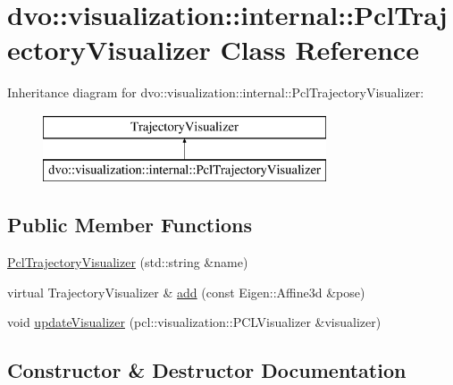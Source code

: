 \hypertarget{classdvo_1_1visualization_1_1internal_1_1_pcl_trajectory_visualizer}{}\section{dvo\+:\+:visualization\+:\+:internal\+:\+:Pcl\+Trajectory\+Visualizer Class Reference}
\label{classdvo_1_1visualization_1_1internal_1_1_pcl_trajectory_visualizer}
Inheritance diagram for dvo\+:\+:visualization\+:\+:internal\+:\+:Pcl\+Trajectory\+Visualizer\+:\begin{figure}[H]
\begin{center}
\leavevmode
\includegraphics[height=2.000000cm]{classdvo_1_1visualization_1_1internal_1_1_pcl_trajectory_visualizer}
\end{center}
\end{figure}
\subsection*{Public Member Functions}
\begin{DoxyCompactItemize}
\item 
\mbox{\hyperlink{classdvo_1_1visualization_1_1internal_1_1_pcl_trajectory_visualizer_a666f91d73d3a6ae83444bcca62e36bec}{Pcl\+Trajectory\+Visualizer}} (std\+::string \&name)
\item 
virtual Trajectory\+Visualizer \& \mbox{\hyperlink{classdvo_1_1visualization_1_1internal_1_1_pcl_trajectory_visualizer_aa174b5910657b2bfed45dfacd429a75a}{add}} (const Eigen\+::\+Affine3d \&pose)
\item 
void \mbox{\hyperlink{classdvo_1_1visualization_1_1internal_1_1_pcl_trajectory_visualizer_a16c8c79c3773408afba9ef57fcaea9e2}{update\+Visualizer}} (pcl\+::visualization\+::\+P\+C\+L\+Visualizer \&visualizer)
\end{DoxyCompactItemize}


\subsection{Constructor \& Destructor Documentation}
\mbox{\label{classdvo_1_1visualization_1_1internal_1_1_pcl_trajectory_visualizer_a666f91d73d3a6ae83444bcca62e36bec}} 
